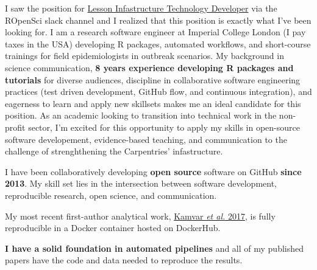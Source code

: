 I saw the position for
\href{https://static.carpentries.org/lesson-infrastructure-technology-developer/}{Lesson
Infastructure Technology Developer} via the ROpenSci slack channel and I
realized that this position is exactly what I've been looking for. I am a
research software engineer at Imperial College London (I pay taxes in the USA)
developing R packages, automated workflows, and short-course trainings for
field epidemiologists in outbreak scenarios. 
My background in science
communication, \textbf{8 years experience developing R packages and tutorials}
for diverse audiences, discipline in collaborative software engineering
practices (test driven development, GitHub flow, and continuous integration),
and eagerness to learn and apply new skillsets makes me an ideal candidate for
this position.  As an academic looking to transition into technical work in the
non-profit sector, I'm excited for this opportunity to apply my skills in
open-source software developement, evidence-based teaching, and communication
to the challenge of strenghthening the Carpentries' infastructure. 

\vspace{1ex}





I have been collaboratively developing \textbf{open source} software on GitHub \textbf{since 2013}.
My skill set lies in the intersection between software development, reproducible research, open science, and communication.



My most recent first-author analytical work,
\href{https://peerj.com/articles/4152/}{Kamvar \textit{et al.} 2017}, is fully
reproducible in a Docker container hosted on
DockerHub.

\textbf{I have a solid foundation in automated
pipelines} and all of my published papers have the code and data needed to
reproduce the results.  

